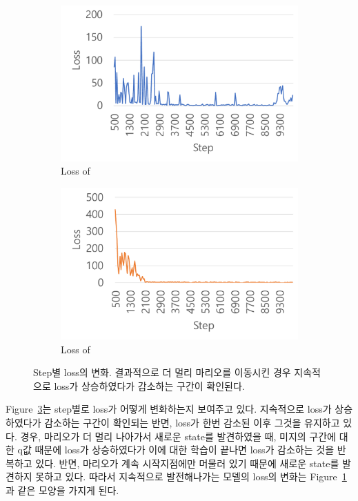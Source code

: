 \begin{figure}[h]
\centering
	\begin{subfigure}[]{.48\textwidth}
		\centering
		\includegraphics[width=1.\textwidth]{FIG/Loss_SADQN.pdf}
		\caption{Loss of \sadqnname}
		\label{fig:loss_sadqn}
	\end{subfigure}%
	\begin{subfigure}[]{.48\textwidth}
		\centering
		\includegraphics[width=1.\textwidth]{FIG/Loss_SAPDQN.pdf}
		\caption{Loss of \sapdqnname}
		\label{fig:loss_sapdqn}
	\end{subfigure}%
\caption{
	Step별 loss의 변화. 결과적으로 더 멀리 마리오를 이동시킨  경우 지속적으로 loss가 상승하였다가 감소하는 구간이 확인된다.
}
\label{fig:loss}
\end{figure}

Figure~\ref{fig:loss}는 step별로   loss가 어떻게 변화하는지 보여주고 있다.
 지속적으로 loss가 상승하였다가 감소하는 구간이 확인되는 반면,  loss가 한번 감소된 이후 그것을 유지하고 있다.
 경우, 마리오가 더 멀리 나아가서 새로운 state를 발견하였을 때, 미지의 구간에 대한 q값 때문에 loss가 상승하였다가 이에 대한 학습이 끝나면 loss가 감소하는 것을 반복하고 있다.
반면,  마리오가 계속 시작지점에만 머물러 있기 때문에 새로운 state를 발견하지 못하고 있다.
따라서 지속적으로 발전해나가는 모델의 loss의 변화는 Figure~\ref{fig:loss_sadqn}과 같은 모양을 가지게 된다.

